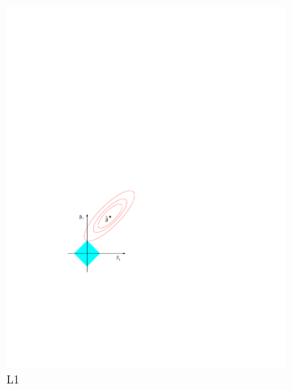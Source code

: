\begin{figure}[H]
  \centering
  \begin{subfigure}[b]{0.48\textwidth}\centering
      \includegraphics[width=\textwidth]{figures/ml/l1}
  \caption{L1}
  \label{fig:ml:l1l2:l1}
  \end{subfigure}
  ~
  \begin{subfigure}[b]{0.48\textwidth}\centering

\end{subfigure}
\end{figure}
